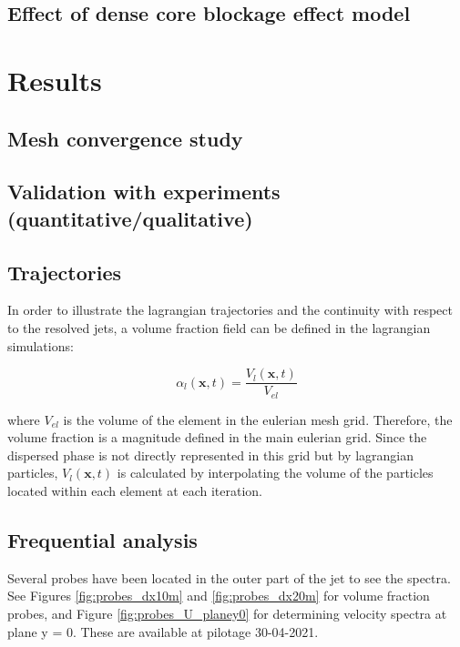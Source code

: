 \subsection{Effect of dense core blockage effect model}

\section{Results}

\subsection{Mesh convergence study}

\subsection{Validation with experiments (quantitative/qualitative)}

\subsection{Trajectories}

In order to illustrate the lagrangian trajectories and the continuity with respect to the resolved jets, a volume fraction field can be defined in the lagrangian simulations:

\begin{equation}
\alpha_l \left( \textbf{x}, t \right) = \frac{V_l \left( \textbf{x}, t \right)}{V_{el}}
\end{equation}

where $V_{el}$ is the volume of the element in the eulerian mesh grid. Therefore, the volume fraction is a magnitude defined in the main eulerian grid. Since the dispersed phase is not directly represented in this grid but by lagrangian particles, $V_l \left( \textbf{x}, t \right)$ is calculated by interpolating the volume of the particles located within each element at each iteration.

\subsection{Frequential analysis}

Several probes have been located in the outer part of the jet to see the spectra. See Figures \ref{fig:probes_dx10m} and \ref{fig:probes_dx20m} for volume fraction probes, and Figure \ref{fig:probes_U_planey0} for determining velocity spectra at plane y = 0. These are available at pilotage 30-04-2021.

